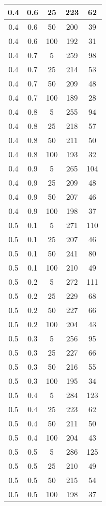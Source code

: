 \begin{appendices}
\begin{center}
\begin{longtable}[c]{|c|c|c|c|c|}
		\hline
		0.4& 0.6& 25& 223&  62\\
		\hline
		0.4& 0.6& 50& 200&  39\\
		\hline
		0.4& 0.6& 100& 192&  31\\
		\hline
		0.4& 0.7& 5& 259&  98\\
		\hline
		0.4& 0.7& 25& 214&  53\\
		\hline
		0.4& 0.7& 50& 209&  48\\
		\hline
		0.4& 0.7& 100& 189&  28\\
		\hline
		0.4& 0.8& 5& 255&  94\\
		\hline
		0.4& 0.8& 25& 218&  57\\
		\hline
		0.4& 0.8& 50& 211&  50\\
		\hline
		0.4& 0.8& 100& 193&  32\\
		\hline
		0.4& 0.9& 5& 265&  104\\
		\hline
		0.4& 0.9& 25& 209&  48\\
		\hline
		0.4& 0.9& 50& 207&  46\\
		\hline
		0.4& 0.9& 100& 198&  37\\
		\hline
		0.5& 0.1& 5& 271&  110\\
		\hline
		0.5& 0.1& 25& 207&  46\\
		\hline
		0.5& 0.1& 50& 241&  80\\
		\hline
		0.5& 0.1& 100& 210&  49\\
		\hline
		0.5& 0.2& 5& 272&  111\\
		\hline
		0.5& 0.2& 25& 229&  68\\
		\hline
		0.5& 0.2& 50& 227&  66\\
		\hline
		0.5& 0.2& 100& 204&  43\\
		\hline
		0.5& 0.3& 5& 256&  95\\
		\hline
		0.5& 0.3& 25& 227&  66\\
		\hline
		0.5& 0.3& 50& 216&  55\\
		\hline
		0.5& 0.3& 100& 195&  34\\
		\hline
		0.5& 0.4& 5& 284&  123\\
		\hline
		0.5& 0.4& 25& 223&  62\\
		\hline
		0.5& 0.4& 50& 211&  50\\
		\hline
		0.5& 0.4& 100& 204&  43\\
		\hline
		0.5& 0.5& 5& 286&  125\\
		\hline
		0.5& 0.5& 25& 210&  49\\
		\hline
		0.5& 0.5& 50& 215&  54\\
		\hline
		0.5& 0.5& 100& 198&  37\\

\end{longtable}
\end{center}
\end{appendices}
